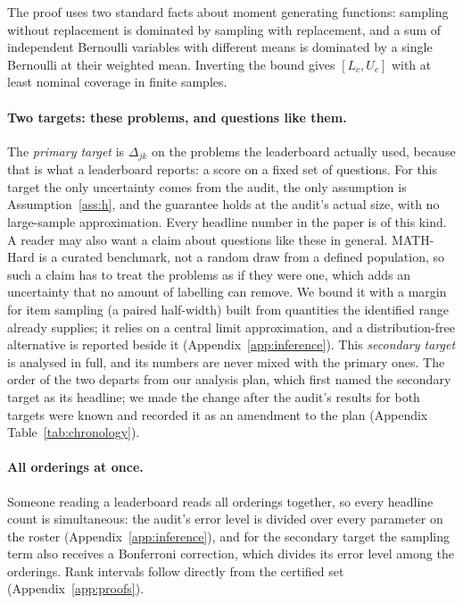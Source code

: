 The proof uses two standard facts about moment generating functions: sampling without
replacement is dominated by sampling with replacement, and a sum of independent Bernoulli
variables with different means is dominated by a single Bernoulli at their weighted mean.
Inverting the bound gives $[L_c, U_c]$ with at least nominal coverage in finite samples.

\paragraph{Two targets: these problems, and questions like them.}
The \emph{primary target} is $\Delta_{jk}$ on the \NumItems{} problems the leaderboard actually
used, because that is what a leaderboard reports: a score on a fixed set of questions. For this
target the only uncertainty comes from the audit, the only assumption is Assumption~\ref{ass:h}, and
the guarantee holds at the audit's actual size, with no large-sample approximation. Every headline number in the paper is of this kind.
A reader may also want a claim about questions like these in general. MATH-Hard is a curated
benchmark, not a random draw from a defined population, so such a claim has to treat the problems
as if they were one, which adds an uncertainty that no amount of labelling can remove. We bound it
with a margin for item sampling (a paired half-width) built from quantities the identified range
already supplies; it relies on a central limit approximation, and a distribution-free alternative is reported beside it
(Appendix~\ref{app:inference}). This \emph{secondary target} is analysed in full, and its numbers are
never mixed with the primary ones. The order of the two departs from our analysis plan, which first
named the secondary target as its headline; we made the change after the audit's results for both
targets were known and recorded it as an amendment to the plan (Appendix Table~\ref{tab:chronology}).

\paragraph{All orderings at once.}
Someone reading a leaderboard reads all \NumOrderings{} orderings together, so every headline count
is simultaneous: the audit's error level is divided over every parameter on the roster
(Appendix~\ref{app:inference}), and for the secondary target the sampling term also receives a
Bonferroni correction, which divides its error level among the orderings. Rank intervals follow directly from the certified set
(Appendix~\ref{app:proofs}).

